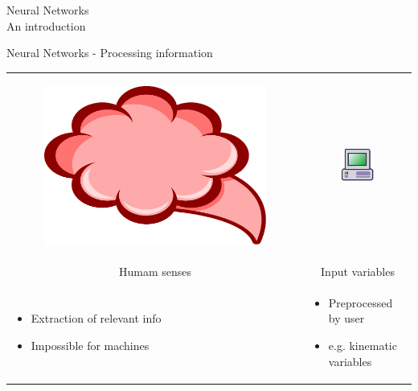 \begin{frame}
    \begin{center}
        \Huge Neural Networks \\ An introduction
    \end{center}
\end{frame}

\begin{frame}{Neural Networks - Processing information}
\begin{tabular}{p{5cm}|p{5cm}}
    \begin{figure}
    	\includegraphics[scale = 0.09]{brain}
    \end{figure}
    & 
    \begin{figure}
    	\includegraphics[scale = 1.4]{machine}
    \end{figure} \\
  \multicolumn{1}{c|}{Humam senses} & \multicolumn{1}{c}{Input variables} \\
    \begin{itemize}
        \item Extraction of relevant info
        \item Impossible for machines
    \end{itemize}
    & 
    \begin{itemize}
      \item Preprocessed by user
      \item {e.g.} kinematic variables

\end{itemize}
\end{tabular}
\end{frame}
